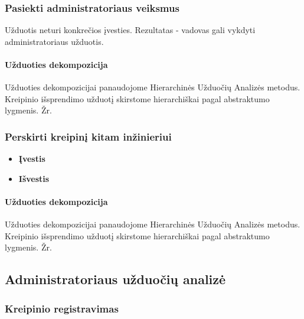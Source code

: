 	\subsubsection{Pasiekti administratoriaus veiksmus}

	Užduotis neturi konkrečios įvesties. 
	Rezultatas - vadovas gali vykdyti administratoriaus užduotis.
		
	\paragraph{Užduoties dekompozicija}
	
	Užduoties dekompozicijai panaudojome Hierarchinės Užduočių Analizės metodus.
	Kreipinio išsprendimo užduotį skirstome hierarchiškai pagal abstraktumo lygmenis. 
	Žr. 	
 		

	\subsubsection{Perskirti kreipinį kitam inžinieriui}

		\begin{itemize}
			\item \textbf{Įvestis}
			\item \textbf{Išvestis} 
		\end{itemize}
		
	\paragraph{Užduoties dekompozicija}
	
	Užduoties dekompozicijai panaudojome Hierarchinės Užduočių Analizės metodus.
	Kreipinio išsprendimo užduotį skirstome hierarchiškai pagal abstraktumo lygmenis. 
	Žr. 
 	

\subsection {Administratoriaus užduočių analizė}

	\subsubsection {Kreipinio registravimas}

